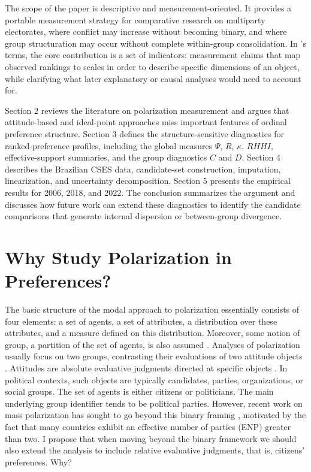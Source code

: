 \documentclass[12pt]{article}
\begin{document}
The scope of the paper is descriptive and measurement-oriented. It provides a portable measurement strategy for comparative research on multiparty electorates, where conflict may increase without becoming binary, and where group structuration may occur without complete within-group consolidation. In \textcite{gerring12_mere_descr}'s terms, the core contribution is a set of indicators: measurement claims that map observed rankings to scales in order to describe specific dimensions of an object, while clarifying what later explanatory or causal analyses would need to account for. 

Section 2 reviews the literature on polarization measurement and argues that attitude-based and ideal-point approaches miss important features of ordinal preference structure. Section 3 defines the structure-sensitive diagnostics for ranked-preference profiles, including the global measures \(\Psi\), \(R\), \(\kappa\), \(RHHI\), effective-support summaries, and the group diagnostics \(C\) and \(D\). Section 4 describes the Brazilian CSES data, candidate-set construction, imputation, linearization, and uncertainty decomposition. Section 5 presents the empirical results for 2006, 2018, and 2022. The conclusion summarizes the argument and discusses how future work can extend these diagnostics to identify the candidate comparisons that generate internal dispersion or between-group divergence.



\section{Why Study Polarization in Preferences?}

The basic structure of the modal approach to polarization essentially consists of four elements: a set of agents, a set of attributes, a distribution over these attributes, and a measure defined on this distribution. Moreover, some notion of group, a partition of the set of agents,  is also assumed \parencite{bramson16_disam_social_polar_concep_measur, esteban1994measurement}.  Analyses of polarization usually focus on two groups, contrasting their evaluations of two attitude objects \parencite{fiorina08_polit_polar_americ_public, mason2015disrespectfully, iyengar12_affec_not_ideol}. Attitudes are absolute evaluative judgments directed at specific objects \parencite{holbrook2011attitude}. In political contexts, such objects are typically candidates, parties, organizations, or social groups. The set of agents is either citizens or politicians. The main underlying group identifier tends to be political parties. However, recent work on mass polarization has sought to go beyond this binary framing  \parencite{kekkonen21_affec_blocs, rothers25_poles_polar, mehlhaff23_group_based_approac_to_measur_polar}, motivated by the fact that many countries exhibit an effective number of parties (ENP) greater than two. I propose that when moving beyond the binary framework we should also extend the analysis to include relative evaluative judgments, that is, citizens' preferences. Why?
\end{document}
